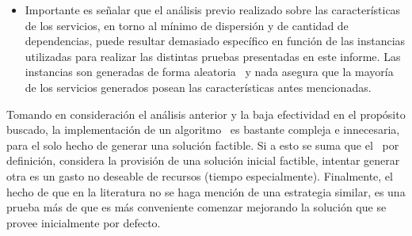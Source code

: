 \documentclass[../informe2.tex]{subfiles}
\begin{document}
\begin{itemize}
	\item Importante es señalar que el análisis previo realizado sobre las características de los servicios, en torno al mínimo de dispersión y de cantidad de dependencias, puede resultar demasiado específico en función de las instancias utilizadas para realizar las distintas pruebas presentadas en este informe. Las instancias son generadas de forma aleatoria~\cite{2012ROADEFresults} y nada asegura que la mayoría de los servicios generados posean las características antes mencionadas.
\end{itemize}
\noindent Tomando en consideración el análisis anterior y la baja efectividad en el propósito buscado, la implementación de un algoritmo \greedy\ es bastante compleja e innecesaria, para el solo hecho de generar una solución factible. Si a esto se suma que el \mrp\ por definición, considera la provisión de una solución inicial factible, intentar generar otra es un gasto no deseable de recursos (tiempo especialmente). Finalmente, el hecho de que en la literatura no se haga mención de una estrategia similar, es una prueba más de que es más conveniente comenzar mejorando la solución que se provee inicialmente por defecto.
\end{document}
